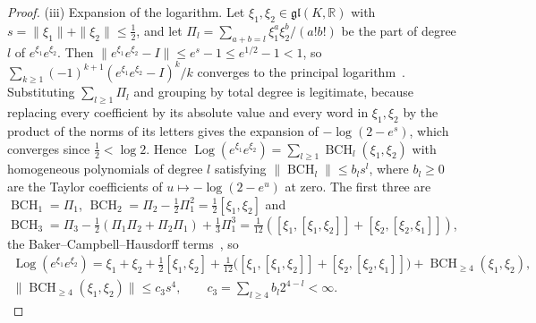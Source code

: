 \begin{proof}
(iii) Expansion of the logarithm. Let $\xi_1,\xi_2\in\mathfrak{gl}(K,\mathbb R)$ with $s=\|\xi_1\|+\|\xi_2\|\leq\frac12$, and let $\Pi_l=\sum_{a+b=l}\xi_1^a\xi_2^b/(a!b!)$ be the part of degree $l$ of $e^{\xi_1}e^{\xi_2}$. Then $\|e^{\xi_1}e^{\xi_2}-I\|\leq e^s-1\leq e^{1/2}-1<1$, so $\sum_{k\geq1}(-1)^{k+1}(e^{\xi_1}e^{\xi_2}-I)^k/k$ converges to the principal logarithm~\cite{Higham2008}. Substituting $\sum_{l\geq1}\Pi_l$ and grouping by total degree is legitimate, because replacing every coefficient by its absolute value and every word in $\xi_1,\xi_2$ by the product of the norms of its letters gives the expansion of $-\log(2-e^s)$, which converges since $\frac12<\log2$. Hence $\operatorname{Log}(e^{\xi_1}e^{\xi_2})=\sum_{l\geq1}\operatorname{BCH}_l(\xi_1,\xi_2)$ with homogeneous polynomials of degree $l$ satisfying $\|\operatorname{BCH}_l\|\leq b_ls^l$, where $b_l\geq0$ are the Taylor coefficients of $u\mapsto-\log(2-e^u)$ at zero. The first three are $\operatorname{BCH}_1=\Pi_1$, $\operatorname{BCH}_2=\Pi_2-\frac12\Pi_1^2=\frac12[\xi_1,\xi_2]$ and $\operatorname{BCH}_3=\Pi_3-\frac12(\Pi_1\Pi_2+\Pi_2\Pi_1)+\frac13\Pi_1^3=\frac1{12}([\xi_1,[\xi_1,\xi_2]]+[\xi_2,[\xi_2,\xi_1]])$, the Baker--Campbell--Hausdorff terms~\cite{Hall2015}, so
\begin{equation}
\begin{gathered}
\operatorname{Log}(e^{\xi_1}e^{\xi_2})=\xi_1+\xi_2+\tfrac12[\xi_1,\xi_2]+\tfrac1{12}\bigl([\xi_1,[\xi_1,\xi_2]]+[\xi_2,[\xi_2,\xi_1]]\bigr)+\operatorname{BCH}_{\geq4}(\xi_1,\xi_2),\\
\|\operatorname{BCH}_{\geq4}(\xi_1,\xi_2)\|\leq c_3s^4,\qquad c_3=\sum_{l\geq4}b_l2^{4-l}<\infty.
\end{gathered}
\label{eq:llp_bch}
\end{equation}


\end{proof}
